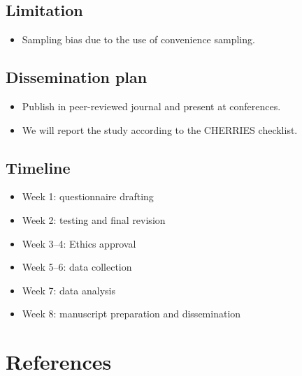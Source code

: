 \documentclass[
  letterpaper,
  DIV=11,
  numbers=noendperiod]{scrartcl}
\providecommand{\tightlist}{%
  \setlength{\itemsep}{0pt}\setlength{\parskip}{0pt}}
\begin{document}
\subsection{Limitation}\label{limitation}

\begin{itemize}
\tightlist
\item
  Sampling bias due to the use of convenience sampling.
\end{itemize}

\subsection{Dissemination plan}\label{dissemination-plan}

\begin{itemize}
\item
  Publish in peer-reviewed journal and present at conferences.
\item
  We will report the study according to the CHERRIES checklist.
\end{itemize}

\subsection{Timeline}\label{timeline}

\begin{itemize}
\item
  Week 1: questionnaire drafting
\item
  Week 2: testing and final revision
\item
  Week 3--4: Ethics approval
\item
  Week 5--6: data collection
\item
  Week 7: data analysis
\item
  Week 8: manuscript preparation and dissemination
\end{itemize}

\section{References}\label{references}
\end{document}
